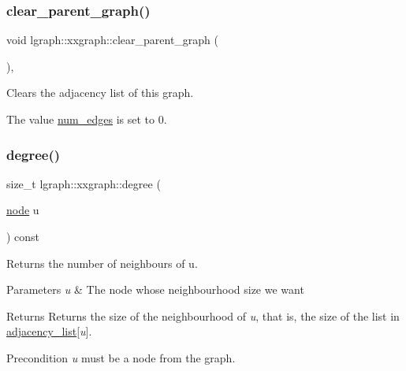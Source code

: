 \subsubsection{\texorpdfstring{clear\+\_\+parent\+\_\+graph()}{clear\_parent\_graph()}}
{\footnotesize\ttfamily void lgraph\+::xxgraph\+::clear\+\_\+parent\+\_\+graph (\begin{DoxyParamCaption}{ }\end{DoxyParamCaption})\hspace{0.3cm}{\ttfamily [protected]}, {\ttfamily [inherited]}}



Clears the adjacency list of this graph. 

The value \hyperlink{classlgraph_1_1xxgraph_a6765a9a3be42f6e0f824635c593b35d7}{num\+\_\+edges} is set to 0. \mbox{\label{classlgraph_1_1xxgraph_a20ebc2927ee8fb8bb0a2c3b448d9ed78}} 
\subsubsection{\texorpdfstring{degree()}{degree()}}
{\footnotesize\ttfamily size\+\_\+t lgraph\+::xxgraph\+::degree (\begin{DoxyParamCaption}\item[{\hyperlink{namespacelgraph_a397169dd66adf725210a30fb7251773e}{node}}]{u }\end{DoxyParamCaption}) const\hspace{0.3cm}{\ttfamily [inherited]}}



Returns the number of neighbours of u. 


\begin{DoxyParams}{Parameters}
{\em u} & The node whose neighbourhood size we want \\
\hline
\end{DoxyParams}
\begin{DoxyReturn}{Returns}
Returns the size of the neighbourhood of {\itshape u}, that is, the size of the list in \hyperlink{classlgraph_1_1xxgraph_a31cf82d0b20be05290be259dc97a51ec}{adjacency\+\_\+list}\mbox{[}{\itshape u}\mbox{]}. 
\end{DoxyReturn}
\begin{DoxyPrecond}{Precondition}
{\itshape u} must be a node from the graph. 
\end{DoxyPrecond}
\mbox{\label{classlgraph_1_1wugraph_a38ed0dfad1c531dd3e6fc217cc061c2d}} 
